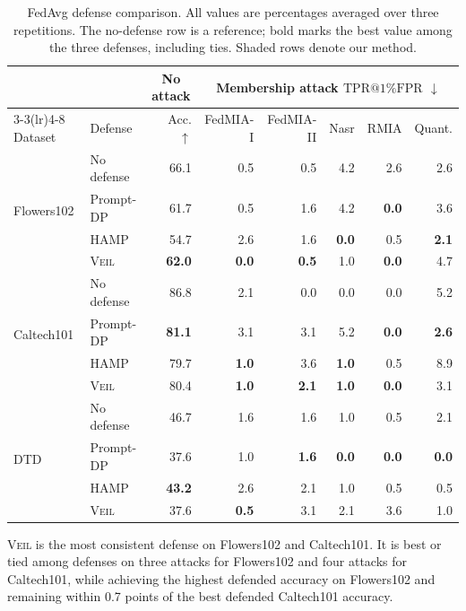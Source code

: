 \documentclass[letterpaper]{article}
\makeatletter
\newcommand{\method}{\textsc{Veil}}
\newcommand{\tpr}{\ensuremath{\mathrm{TPR}@1\%\mathrm{FPR}}}
\makeatother
\begin{document}
\begin{table}[t]
\centering
\small
\setlength{\tabcolsep}{5.0pt}
\begin{tabular}{llrrrrrr}
\toprule
& & \multicolumn{1}{c}{No attack} &
\multicolumn{5}{c}{Membership attack \tpr{} $\downarrow$}\\
\cmidrule(lr){3-3}\cmidrule(lr){4-8}
Dataset & Defense & Acc. $\uparrow$ & FedMIA-I & FedMIA-II & Nasr & RMIA & Quant.\\
\midrule
\multirow{4}{*}{Flowers102}
& No defense & 66.1 & 0.5 & 0.5 & 4.2 & 2.6 & 2.6\\
& Prompt-DP & 61.7 & 0.5 & 1.6 & 4.2 & \textbf{0.0} & 3.6\\
& HAMP & 54.7 & 2.6 & 1.6 & \textbf{0.0} & 0.5 & \textbf{2.1}\\
\rowcolor{veilshade}
& \method{} & \textbf{62.0} & \textbf{0.0} & \textbf{0.5} & 1.0 & \textbf{0.0} & 4.7\\
\midrule
\multirow{4}{*}{Caltech101}
& No defense & 86.8 & 2.1 & 0.0 & 0.0 & 0.0 & 5.2\\
& Prompt-DP & \textbf{81.1} & 3.1 & 3.1 & 5.2 & \textbf{0.0} & \textbf{2.6}\\
& HAMP & 79.7 & \textbf{1.0} & 3.6 & \textbf{1.0} & 0.5 & 8.9\\
\rowcolor{veilshade}
& \method{} & 80.4 & \textbf{1.0} & \textbf{2.1} & \textbf{1.0} & \textbf{0.0} & 3.1\\
\midrule
\multirow{4}{*}{DTD}
& No defense & 46.7 & 1.6 & 1.6 & 1.0 & 0.5 & 2.1\\
& Prompt-DP & 37.6 & 1.0 & \textbf{1.6} & \textbf{0.0} & \textbf{0.0} & \textbf{0.0}\\
& HAMP & \textbf{43.2} & 2.6 & 2.1 & 1.0 & 0.5 & 0.5\\
\rowcolor{veilshade}
& \method{} & 37.6 & \textbf{0.5} & 3.1 & 2.1 & 3.6 & 1.0\\
\bottomrule
\end{tabular}
\caption{FedAvg defense comparison.  All values are percentages averaged over
three repetitions.  The no-defense row is a reference; bold marks the best
value among the three defenses, including ties.  Shaded rows denote our method.}
\label{tab:fedavg}
\end{table}

\method{} is the most consistent defense on Flowers102 and Caltech101.  It is
best or tied among defenses on three attacks for Flowers102 and four attacks for
Caltech101, while achieving the highest defended accuracy on Flowers102 and
remaining within 0.7 points of the best defended Caltech101 accuracy.
\end{document}
